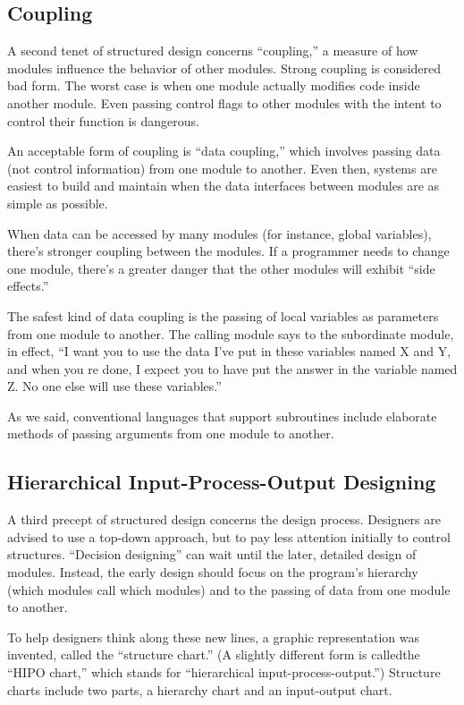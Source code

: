 \subsection{Coupling}

A second tenet of structured design concerns {}``coupling,'' a measure
of how modules influence the behavior of other modules. Strong coupling
is considered bad form. The worst case is when one module actually
modifies code inside another module. Even passing control flags to
other modules with the intent to control their function is dangerous.

An acceptable form of coupling is {}``data coupling,'' which involves
passing data (not control information) from one module to another.
Even then, systems are easiest to build and maintain when the data
interfaces between modules are as simple as possible.

When data can be accessed by many modules (for instance, global variables),
there's stronger coupling between the modules. If a programmer needs
to change one module, there's a greater danger that the other modules
will exhibit {}``side effects.''

The safest kind of data coupling is the passing of local variables
as parameters from one module to another. The calling module says
to the subordinate module, in effect, {}``I want you to use the data
I've put in these variables named X and Y, and when you re done, I
expect you to have put the answer in the variable named Z. No one
else will use these variables.''

As we said, conventional languages that support subroutines include
elaborate methods of passing arguments from one module to another.


\subsection{Hierarchical Input-Process-Output Designing}

A third precept of structured design concerns the design process.
Designers are advised to use a top-down approach, but to pay less
attention initially to control structures. {}``Decision designing''
can wait until the later, detailed design of modules. Instead, the
early design should focus on the program's hierarchy (which modules
call which modules) and to the passing of data from one module to
another.

To help designers think along these new lines, a graphic representation
was invented, called the {}``structure chart.'' (A slightly different
form is calledthe {}``HIPO chart,'' which stands for {}``hierarchical
input-process-output.'') Structure charts include two parts, a hierarchy
chart and an input-output chart.

